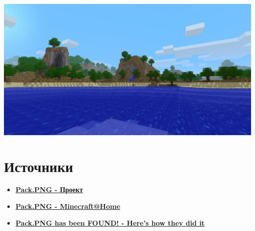 \begin{center}
    \includegraphics[width=\linewidth]{final.png}
\end{center}




\section{Источники}
\begin{itemize}
    \item \href{https://packpng.com/}{\textbf{Pack.PNG - Проект}}
    \item \href{https://minecraftathome.com/projects/packpng.html}{\textbf{Pack.PNG - Minecraft@Home}}
    \item \href{https://www.youtube.com/watch?v=ea6py9q46QU}{\textbf{Pack.PNG has been FOUND! - Here's how they did it}}
\end{itemize}


